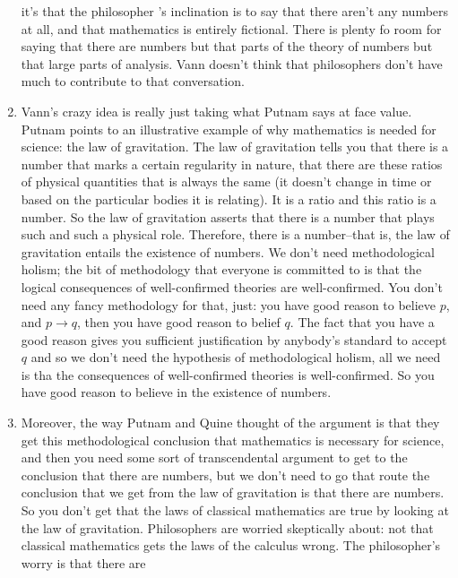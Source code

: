 \documentclass[12pt]{article}
\theoremstyle{definition}
\begin{document}
\begin{enumerate}
        it's that the philosopher 's inclination is to say that there aren't
        any numbers at all, and that mathematics is entirely fictional. There
        is plenty fo room for saying that there are numbers but that parts of
        the theory of numbers but that large parts of analysis. Vann doesn't
        think that philosophers don't have much to contribute to that
        conversation.
    \item
        Vann's crazy idea is really just taking what Putnam says at face value.
        Putnam points to an illustrative example of why mathematics is needed
        for science: the law of gravitation. The law of gravitation tells you
        that there is a number that marks a certain regularity in nature, that
        there are these ratios of physical quantities that is always the same
        (it doesn't change in time or based on the particular bodies it is
        relating). It is a ratio and this ratio is a number. So the law of
        gravitation asserts that there is a number that plays such and such a
        physical role. Therefore, there is a number--that is, the law of
        gravitation entails the existence of numbers. We don't need
        methodological holism; the bit of methodology that everyone is
        committed to is that the logical consequences of well-confirmed
        theories are well-confirmed. You don't need any fancy methodology for
        that, just: you have good reason to believe $p$, and $p \rightarrow q$,
        then you have good reason to belief $q$. The fact that you have a good
        reason gives you sufficient justification by anybody's standard to
        accept $q$ and so we don't need the hypothesis of methodological
        holism, all we need is tha the consequences of well-confirmed theories
        is well-confirmed. So you have good reason to believe in the existence
        of numbers.
    \item
        Moreover, the way Putnam and Quine thought of the argument is that they
        get this methodological conclusion that mathematics is necessary for
        science, and then you need some sort of transcendental argument to get
        to the conclusion that there are numbers, but we don't need to go that
        route the conclusion that we get from the law of gravitation is that
        there are numbers. So you don't get that the laws of classical
        mathematics are true by looking at the law of gravitation. Philosophers
        are worried skeptically about: not that classical mathematics gets the
        laws of the calculus wrong. The philosopher's worry is that there are

\end{enumerate}
\end{document}
